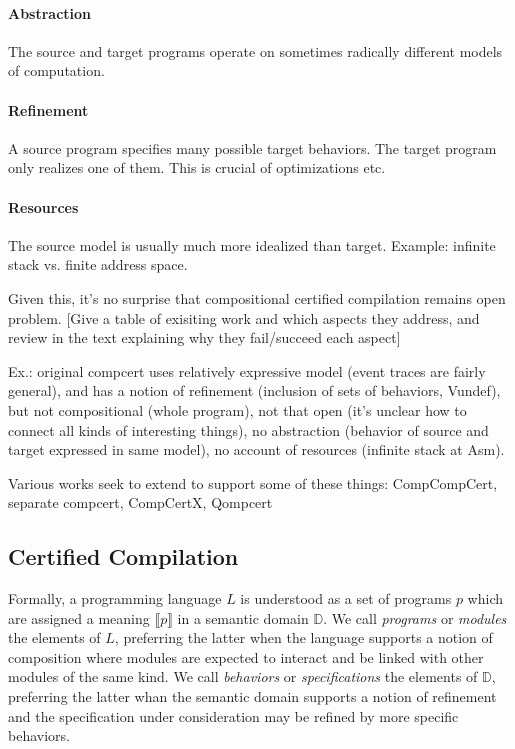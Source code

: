 \documentclass[sigplan,10pt,review,anonymous]{acmart}
\begin{document}
\paragraph{Abstraction}
The source and target programs
operate on sometimes radically different
models of computation.

\paragraph{Refinement}
A source program specifies many possible target behaviors.
The target program only realizes one of them.
This is crucial of optimizations etc.

\paragraph{Resources}
The source model is usually much more idealized than target.
Example: infinite stack vs. finite address space.

Given this,
it's no surprise that compositional certified compilation
remains open problem.
[Give a table of exisiting work and which aspects they address,
and review in the text explaining why they fail/succeed each aspect]

Ex.: original compcert uses relatively expressive model
(event traces are fairly general),
and has a notion of refinement (inclusion of sets of behaviors, Vundef),
but not compositional (whole program),
not that open (it's unclear how to connect all kinds of interesting things),
no abstraction (behavior of source and target expressed in same model),
no account of resources (infinite stack at Asm).

Various works seek to extend to support some of these things:
CompCompCert, separate compcert, CompCertX, Qompcert


\subsection{Certified Compilation} %

Formally,
a programming language $L$ is understood as
a set of programs $p$
which are assigned a meaning $\llbracket p \rrbracket$
in a semantic domain $\mathbb{D}$.
We call \emph{programs} or \emph{modules} the elements of $L$,
preferring the latter when the language supports
a notion of composition where modules are expected to
interact and be linked with other modules of the same kind.
We call \emph{behaviors} or \emph{specifications}
the elements of $\mathbb{D}$,
preferring the latter whan the semantic domain supports
a notion of refinement and the specification under consideration
may be refined by more specific behaviors.
\end{document}
